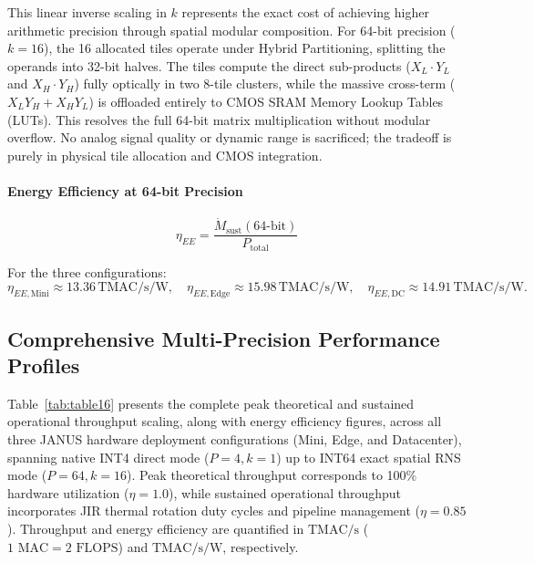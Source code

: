 \documentclass[journal]{IEEEtran}
\begin{document}
This linear inverse scaling in $k$ represents the exact cost of achieving higher arithmetic precision through spatial modular composition. For 64-bit precision ($k=16$), the 16 allocated tiles operate under Hybrid Partitioning, splitting the operands into 32-bit halves. The tiles compute the direct sub-products ($X_L \cdot Y_L$ and $X_H \cdot Y_H$) fully optically in two 8-tile clusters, while the massive cross-term ($X_L Y_H + X_H Y_L$) is offloaded entirely to CMOS SRAM Memory Lookup Tables (LUTs). This resolves the full 64-bit matrix multiplication without modular overflow. No analog signal quality or dynamic range is sacrificed; the tradeoff is purely in physical tile allocation and CMOS integration.

\paragraph{\textbf{Energy Efficiency at 64-bit Precision}}

\begin{equation}
\eta_{EE} = \frac{\dot{M}_{\text{sust}}(64\text{-bit})}{P_{\text{total}}}
\end{equation}

For the three configurations:
\begin{equation}
\eta_{EE,\mathrm{Mini}} \approx 13.36\,\text{TMAC/s/W}, \quad \eta_{EE,\mathrm{Edge}} \approx 15.98\,\text{TMAC/s/W}, \quad \eta_{EE,\mathrm{DC}} \approx 14.91\,\text{TMAC/s/W}.
\end{equation}

\subsection{\textbf{Comprehensive Multi-Precision Performance Profiles}}
\label{sec:multi_precision_profiles}

Table~\ref{tab:table16} presents the complete peak theoretical and sustained operational throughput scaling, along with energy efficiency figures, across all three JANUS hardware deployment configurations (Mini, Edge, and Datacenter), spanning native INT4 direct mode ($P=4, k=1$) up to INT64 exact spatial RNS mode ($P=64, k=16$). Peak theoretical throughput corresponds to 100\% hardware utilization ($\eta = 1.0$), while sustained operational throughput incorporates JIR thermal rotation duty cycles and pipeline management ($\eta = 0.85$). Throughput and energy efficiency are quantified in $\text{TMAC/s}$ ($1\text{ MAC} = 2\text{ FLOPS}$) and $\text{TMAC/s/W}$, respectively.
\end{document}
